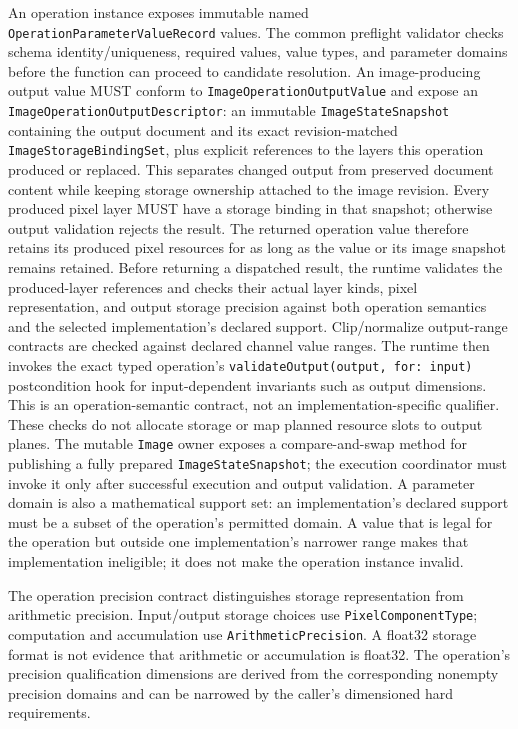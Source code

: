 \documentclass[11pt,a4paper,oneside]{article}
\begin{document}
An operation instance exposes immutable named \texttt{OperationParameterValueRecord} values. The common preflight validator checks schema identity/uniqueness, required values, value types, and parameter domains before the function can proceed to candidate resolution. An image-producing output value MUST conform to \texttt{ImageOperationOutputValue} and expose an \texttt{ImageOperationOutputDescriptor}: an immutable \texttt{ImageStateSnapshot} containing the output document and its exact revision-matched \texttt{ImageStorageBindingSet}, plus explicit references to the layers this operation produced or replaced. This separates changed output from preserved document content while keeping storage ownership attached to the image revision. Every produced pixel layer MUST have a storage binding in that snapshot; otherwise output validation rejects the result. The returned operation value therefore retains its produced pixel resources for as long as the value or its image snapshot remains retained. Before returning a dispatched result, the runtime validates the produced-layer references and checks their actual layer kinds, pixel representation, and output storage precision against both operation semantics and the selected implementation's declared support. Clip/normalize output-range contracts are checked against declared channel value ranges. The runtime then invokes the exact typed operation's \texttt{validateOutput(output, for: input)} postcondition hook for input-dependent invariants such as output dimensions. This is an operation-semantic contract, not an implementation-specific qualifier. These checks do not allocate storage or map planned resource slots to output planes. The mutable \texttt{Image} owner exposes a compare-and-swap method for publishing a fully prepared \texttt{ImageStateSnapshot}; the execution coordinator must invoke it only after successful execution and output validation. A parameter domain is also a mathematical support set: an implementation's declared support must be a subset of the operation's permitted domain. A value that is legal for the operation but outside one implementation's narrower range makes that implementation ineligible; it does not make the operation instance invalid.

The operation precision contract distinguishes storage representation from arithmetic precision. Input/output storage choices use \texttt{PixelComponentType}; computation and accumulation use \texttt{ArithmeticPrecision}. A float32 storage format is not evidence that arithmetic or accumulation is float32. The operation's precision qualification dimensions are derived from the corresponding nonempty precision domains and can be narrowed by the caller's dimensioned hard requirements.
\end{document}
